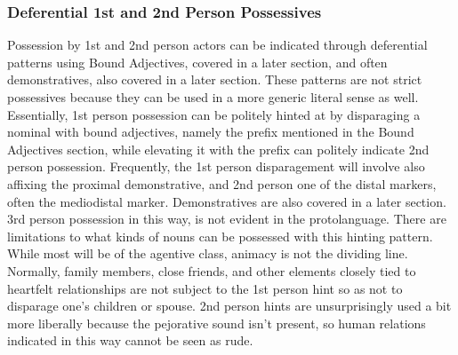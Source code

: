     \subsubsection{Deferential 1st and 2nd Person Possessives}
    Possession by 1st and 2nd person actors can be indicated through deferential patterns using Bound Adjectives, covered in a later section, and often demonstratives, also covered in a later section. These patterns are not strict possessives because they can be used in a more generic literal sense as well. Essentially, 1st person possession can be politely hinted at by disparaging a nominal with bound adjectives, namely the \prefixtext{\boundbad} prefix mentioned in the Bound Adjectives section, while elevating it with the \prefixtext{\boundtrue} prefix can politely indicate 2nd person possession. Frequently, the 1st person disparagement will involve also affixing the proximal demonstrative, and 2nd person one of the distal markers, often the mediodistal marker. Demonstratives are also covered in a later section. 3rd person possession in this way, is not evident in the protolanguage.
    There are limitations to what kinds of nouns can be possessed with this hinting pattern. While most will be of the agentive class, animacy is not the dividing line. Normally, family members, close friends, and other elements closely tied to heartfelt relationships are not subject to the 1st person hint so as not to disparage one's children or spouse. 2nd person hints are unsurprisingly used a bit more liberally because the pejorative sound isn't present, so human relations indicated in this way cannot be seen as rude.

